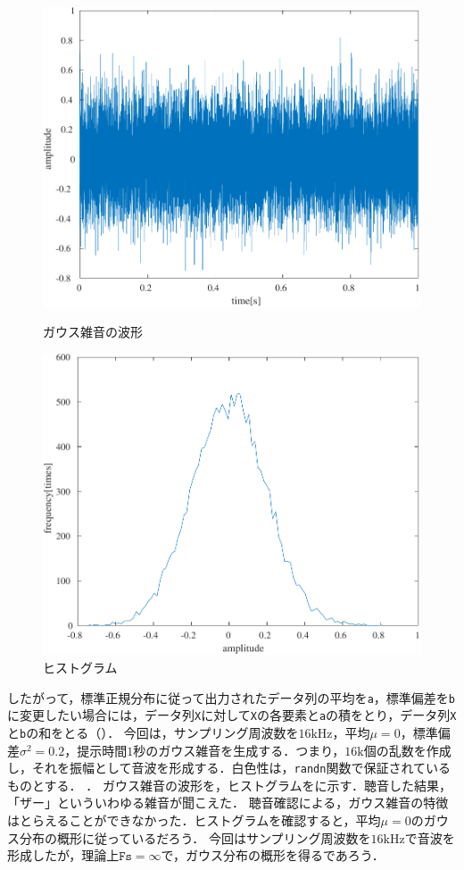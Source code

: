 \begin{figure}
    \centering
    \includegraphics[keepaspectratio,width=.3\textwidth]{../../Figures/01_05_0.pdf}
    \caption{ガウス雑音の波形}
    \label{fig:ガウス雑音の波形}
    \includegraphics[keepaspectratio,width=.3\textwidth]{../../Figures/01_05_1.pdf}
    \caption{ヒストグラム}
    \label{fig:ヒストグラム}
\end{figure}

したがって，標準正規分布に従って出力されたデータ列の平均を\texttt{a}，標準偏差を\texttt{b}に変更したい場合には，データ列\texttt{X}に対して\texttt{X}の各要素と\texttt{a}の積をとり，データ列\texttt{X}と\texttt{b}の和をとる（）．
今回は，サンプリング周波数を\(16\textrm{kHz}\)，平均\(\mu=0\)，標準偏差\(\sigma^2=0.2\)，提示時間\(1\)秒のガウス雑音を生成する．つまり，\(16\textrm{k}\)個の乱数を作成し，それを振幅として音波を形成する．白色性は，\texttt{randn}関数で保証されているものとする．
\scall{}．
\result
ガウス雑音の波形を，ヒストグラムをに示す．聴音した結果，「ザー」といういわゆる雑音が聞こえた．
\consideration
聴音確認による，ガウス雑音の特徴はとらえることができなかった．ヒストグラムを確認すると，平均\(\mu=0\)のガウス分布の概形に従っているだろう．
今回はサンプリング周波数を\(16\textrm{kHz}\)で音波を形成したが，理論上\(\texttt{Fs}=\infty\)で，ガウス分布の概形を得るであろう．
